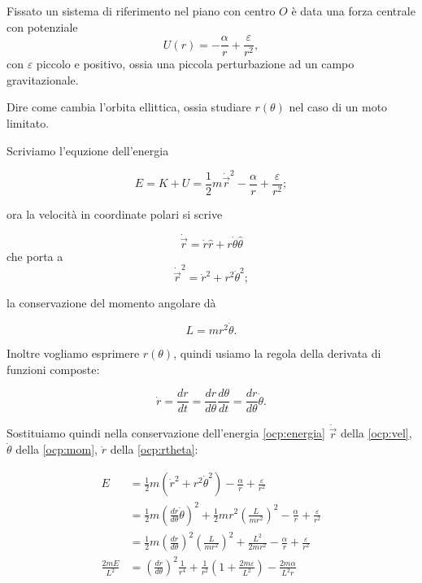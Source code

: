 \documentclass[../main.tex]{subfiles}
\begin{document}

\textex

Fissato un sistema di riferimento nel piano con centro $O$ è data una forza centrale con potenziale
\begin{equation}
  \label{ocp:potenziale}
  U(r)=-\frac{\alpha}{r}+\frac{\varepsilon}{r^2},
\end{equation}
con $\varepsilon$ piccolo e positivo, ossia una piccola perturbazione ad un campo gravitazionale.

Dire come cambia l'orbita ellittica, ossia studiare $r(\theta)$ nel caso di un moto limitato.

\solution

Scriviamo l'equzione dell'energia

\begin{equation}
  \label{ocp:energia}
  E=K+U=\frac{1}{2}m{\dot{\overrightarrow r}^2}-\frac{\alpha}{r}+\frac{\varepsilon}{r^2};
\end{equation}

ora la velocità in coordinate polari si scrive

\[
 \dot{\overrightarrow{r}}=\dot{r}\hat{r}+r\dot{\theta}\hat{\theta}
\]
che porta a
\begin{equation}
 \label{ocp:vel}
 {\dot{\overrightarrow{r}}}^2={\dot{r}}^2+r^2{\dot{\theta}}^2;
\end{equation}

la conservazione del momento angolare dà

\begin{equation}
 \label{ocp:mom}
 L=mr^2\dot{\theta}.
\end{equation}

Inoltre vogliamo esprimere $r(\theta)$, quindi usiamo la regola della derivata di funzioni composte:

\begin{equation}
  \label{ocp:rtheta}
 \dot{r}=\frac{dr}{dt}=\frac{dr}{d\theta}\frac{d\theta}{dt}=\frac{dr}{d\theta}\dot{\theta}.
\end{equation}

Sostituiamo quindi nella conservazione dell'energia \cref{ocp:energia} $\dot{\overrightarrow{r}}$ della \cref{ocp:vel},
$\dot{\theta}$ della \cref{ocp:mom}, $\dot{r}$ della \cref{ocp:rtheta}:

\begin{align*}
 E&=\frac{1}{2}m({\dot{r}}^2+r^2{\dot{\theta}}^2)-\frac{\alpha}{r}+\frac{\varepsilon}{r^2} \\
 &=\frac{1}{2}m\left(\frac{dr}{d\theta}\dot{\theta}\right)^2+\frac{1}{2}mr^2\left(\frac{L}{mr^2}\right)^2-\frac{\alpha}{r}+\frac{\varepsilon}{r^2} \\
 &=\frac{1}{2}m\left(\frac{dr}{d\theta}\right)^2\left(\frac{L}{mr^2}\right)^2+\frac{L^2}{2mr^2}-\frac{\alpha}{r}+\frac{\varepsilon}{r^2} \\
 \frac{2mE}{L^2}&=\left(\frac{dr}{d\theta}\right)^2\frac{1}{r^4}+\frac{1}{r^2}\left(1+\frac{2m\varepsilon}{L^2}\right)-\frac{2m\alpha}{L^2r}
\end{align*}
\end{document}
